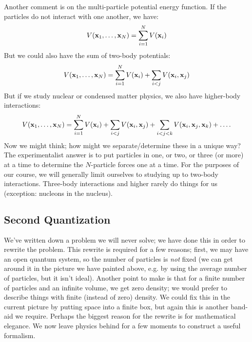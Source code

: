 Another comment is on the multi-particle potential energy function. If the particles do not interact with one another, we have:
\begin{equation}
    V(\mathbf{x}_1, \ldots, \mathbf{x}_N) = \sum_{i=1}^N V(\mathbf{x}_i)
\end{equation}
But we could also have the sum of two-body potentials:
\begin{equation}
    V(\mathbf{x}_1, \ldots, \mathbf{x}_N) = \sum_{i=1}^N V(\mathbf{x}_i) + \sum_{i < j}V(\mathbf{x}_i, \mathbf{x}_j)
\end{equation}
But if we study nuclear or condensed matter physics, we also have higher-body interactions:
\begin{equation}
    V(\mathbf{x}_1, \ldots, \mathbf{x}_N) = \sum_{i=1}^N V(\mathbf{x}_i) + \sum_{i < j}V(\mathbf{x}_i, \mathbf{x}_j) + \sum_{i < j < k}V(\mathbf{x}_i, \mathbf{x}_j, \mathbf{x}_k) + \ldots.
\end{equation}
Now we might think; how might we separate/determine these in a unique way? The experimentalist answer is to put particles in one, or two, or three (or more) at a time to determine the $N$-particle forces one at a time. For the purposes of our course, we will generally limit ourselves to studying up to two-body interactions. Three-body interactions and higher rarely do things for us (exception: nucleons in the nucleus).

\subsection{Second Quantization}

We've written down a problem we will never solve; we have done this in order to rewrite the problem. This rewrite is required for a few reasons; first, we may have an open quantum system, so the number of particles is \emph{not} fixed (we can get around it in the picture we have painted above, e.g. by using the average number of particles, but it isn't ideal). Another point to make is that for a finite number of particles and an infinite volume, we get zero density; we would prefer to describe things with finite (instead of zero) density. We could fix this in the current picture by putting space into a finite box, but again this is another band-aid we require. Perhaps the biggest reason for the rewrite is for mathematical elegance. We now leave physics behind for a few moments to construct a useful formalism.

